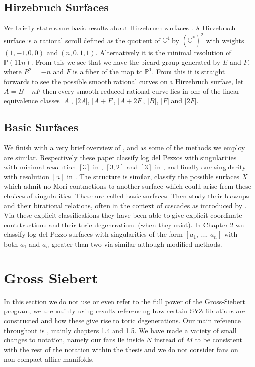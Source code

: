 \documentclass[12pt]{amsbook}
\theoremstyle{plain}
\newcommand{\mb}[1]{\mathbb{#1}}
\begin{document}
\subsection{Hirzebruch Surfaces} %
We briefly state some basic results about Hirzebruch surfaces \cite{Park}. A Hirzebruch surface is a rational scroll defined as the quotient of $\mb{C}^4$ by $(\mb{C}^*)^2$ with weights $(1,-1,0,0)$ and $(n, 0, 1,1)$. Alternatively it is the minimal resolution of $\mb{P}(11n)$. From this we see that we have the picard group generated by $B$ and $F$, where $B^2 = -n$ and $F$ is a fiber of the map to $\mb{P}^1$. From this it is straight forwards to see the possible smooth rational curves on a Hirzebruch surface, let $A = B+ nF$ then every smooth reduced rational curve lies in one of the linear equivalence classes $|A|$, $|2A|$, $|A+F|$, $|A+2F|$, $|B|$, $|F|$ and $|2F|$. 
\subsection{Basic Surfaces}
We finish with a very brief overview of \cite{CortiHeu}, \cite{Cuzzucoli} and \cite{CaveyPrince} as some of the methods we employ are similar. Respectively these paper classify log del Pezzos with singularities with minimal resolution $[3]$ in \cite{CortiHeu}, $[3,2]$ and $[3]$ in \cite{Cuzzucoli}, and finally one singularity with resolution $[n]$ in \cite{CaveyPrince}. The structure is similar, classify the possible surfaces $X$ which admit no Mori contractions to another surface which could arise from these choices of singularities. These are called basic surfaces. Then study their blowups and their birational relations, often in the context of cascades as introduced by \cite{ReidSuzuki}. Via these explicit classifications they have been able to give explicit coordinate contstructions and their toric degenerations (when they exist). In Chapter 2 we classify log del Pezzo surfaces with singularities of the form $[a_1, \, \dots ,   \, a_n]$ with both $a_1$ and $a_n$ greater than two via similar although modified methods.


\section{Gross Siebert}

In this section we do not use or even refer to the full power of the Gross-Siebert program, we are mainly using results referencing how certain SYZ fibrations are constructed and how these give rise to toric degenerations. Our main reference throughout is \cite{GrossBook}, mainly chapters 1.4 and 1.5. We have made a variety of small changes to notation, namely our fans lie inside $N$ instead of $M$ to be consistent with the rest of the notation within the thesis and we do not consider fans on non compact affine manifolds.
\end{document}
